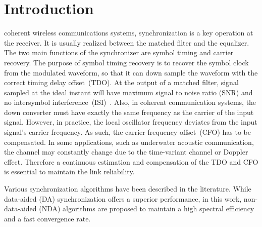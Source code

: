\documentclass[journal,comsoc, onecolumn, 12pt,draftclsnofoot]{IEEEtran} %
\begin{document}
\section{Introduction}
\label{sec:intro}
 coherent wireless communications systems, synchronization is a key operation at the receiver.
It is usually realized between the matched filter and the equalizer.
The two main functions of the synchronizer are symbol timing and carrier recovery.
The purpose of symbol timing recovery is to recover the symbol clock from the modulated waveform, so that it can down sample the waveform with the correct timing delay offset~(TDO).
At the output of a matched filter, signal sampled at the ideal instant will have maximum signal to noise ratio (SNR) and no intersymbol interference~(ISI)~\cite{mengali1997synchronization}.
Also, in coherent communication systems, the down converter must have exactly the same frequency as the carrier of the input signal. 
However, in practice, the local oscillator frequency deviates from the input signal's carrier frequency.  
As such, the carrier frequency offset~(CFO) has to be compensated. 
In some applications, such as underwater acoustic communication, the channel may constantly change due to the time-variant channel or Doppler effect. 
Therefore a continuous estimation and compensation of the TDO and CFO is essential to maintain the link reliability.

Various synchronization algorithms have been described in the literature.
While data-aided (DA) synchronization offers a superior performance, in this work, non-data-aided (NDA) algorithms  are proposed to maintain a high spectral efficiency and a fast convergence rate. 




\end{document}
